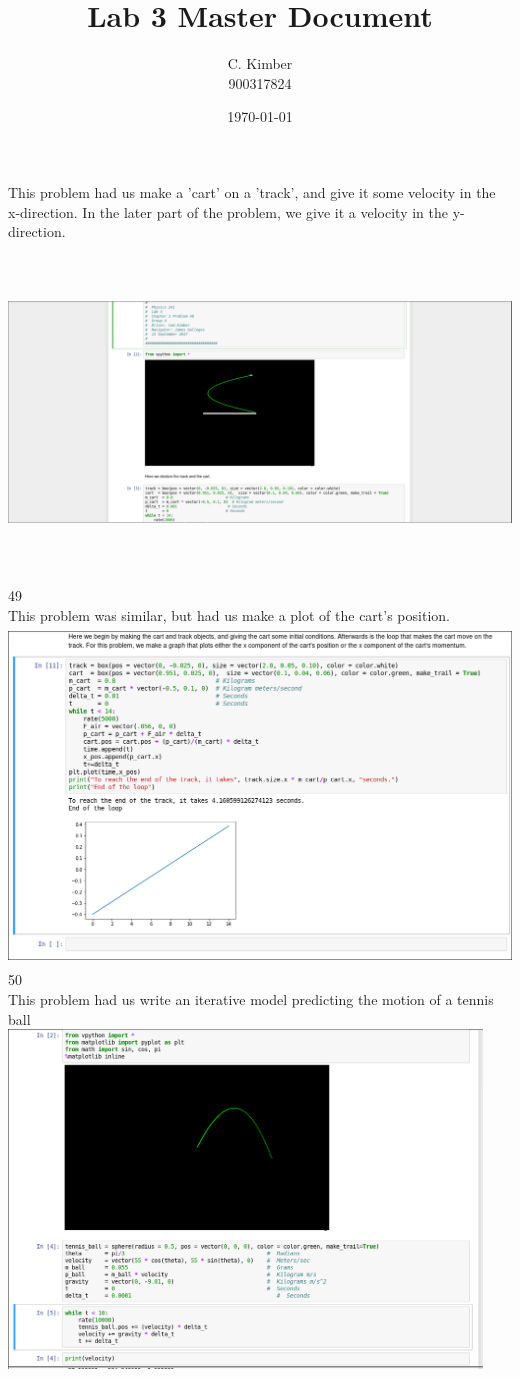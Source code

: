 \documentclass[a4paper,11pt]{article}
\begin{document}
\title{Lab 3 Master Document}
\date{\today}
\author{C. Kimber\\900317824}
\maketitle
\newpage
{}
This problem had us make a 'cart' on a 'track', and give it some velocity in the x-direction. In the later part of the problem, we give it a velocity in the y-direction.\\
\includegraphics[height=9cm]{p48.png}\\
49\\
This problem was similar, but had us make a plot of the cart's position.\\
\includegraphics[height=9cm]{p49.png}\\
50\\
This problem had us write an iterative  model predicting the motion of a tennis ball\\
\includegraphics[height=9cm]{p50.png}\\
\end{document}
